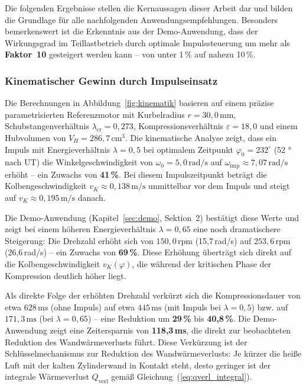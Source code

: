 ﻿\documentclass[a4paper,12pt]{article}
\begin{document}
Die folgenden Ergebnisse stellen die Kernaussagen dieser Arbeit dar und
bilden die Grundlage für alle nachfolgenden Anwendungsempfehlungen. Besonders
bemerkenswert ist die Erkenntnis aus der Demo-Anwendung, dass der Wirkungsgrad
im Teillastbetrieb durch optimale Impulssteuerung um mehr als \textbf{Faktor~10}
gesteigert werden kann -- von unter 1\,\% auf nahezu 10\,\%.

\subsubsection*{Kinematischer Gewinn durch Impulseinsatz}

Die Berechnungen in Abbildung~\ref{fig:kinematik} basieren auf einem
präzise parametrisierten Referenzmotor mit Kurbelradius $r = 30{,}0\,\text{mm}$,
Schubstangenverhältnis $\lambda_\text{cr} = 0{,}273$, Kompressionsverhältnis
$\varepsilon = 18{,}0$ und einem Hubvolumen von $V_H = 286{,}7\,\text{cm}^3$.
Die kinematische Analyse zeigt, dass ein Impuls mit Energieverhältnis
$\lambda = 0{,}5$ bei optimalem Zeitpunkt $\varphi_0 = 232^\circ$ (52 ° nach UT)
die Winkelgeschwindigkeit von $\omega_0 = 5{,}0\,\text{rad/s}$ auf
$\omega_\text{imp} \approx 7{,}07\,\text{rad/s}$ erhöht -- ein Zuwachs von
\textbf{41\,\%}. Bei diesem Impulszeitpunkt beträgt die Kolbengeschwindigkeit
$v_K \approx 0{,}138\,\text{m/s}$ unmittelbar vor dem Impuls und steigt auf
$v_K \approx 0{,}195\,\text{m/s}$ danach.

Die Demo-Anwendung (Kapitel~\ref{sec:demo}, Sektion~2) bestätigt diese
Werte und zeigt bei einem höheren Energieverhältnis $\lambda = 0{,}65$
eine noch dramatischere Steigerung: Die Drehzahl erhöht sich von
$150{,}0\,\text{rpm}$ (15{,}7\,rad/s) auf $253{,}6\,\text{rpm}$
(26{,}6\,rad/s) -- ein Zuwachs von \textbf{69\,\%}. Diese Erhöhung überträgt
sich direkt auf die Kolbengeschwindigkeit $v_K(\varphi)$, die während der
kritischen Phase der Kompression deutlich höher liegt.

Als direkte Folge der erhöhten Drehzahl verkürzt sich die Kompressionsdauer
von etwa $628\,\text{ms}$ (ohne Impuls) auf etwa $445\,\text{ms}$ (mit Impuls
bei $\lambda = 0{,}5$) bzw. auf $171{,}3\,\text{ms}$ (bei $\lambda = 0{,}65$)
-- eine Reduktion um \textbf{29\,\%} bis \textbf{40{,}8\,\%}. Die
Demo-Anwendung zeigt eine Zeitersparnis von \textbf{118{,}3\,ms}, die
direkt zur beobachteten Reduktion des Wandwärmeverlusts führt. Diese
Verkürzung ist der Schlüsselmechanismus zur Reduktion des Wandwärmeverlusts:
Je kürzer die heiße Luft mit der kalten Zylinderwand in Kontakt steht,
desto geringer ist der integrale Wärmeverlust $Q_\text{verl}$ gemäß
Gleichung~(\ref{eq:qverl_integral}).
\end{document}
